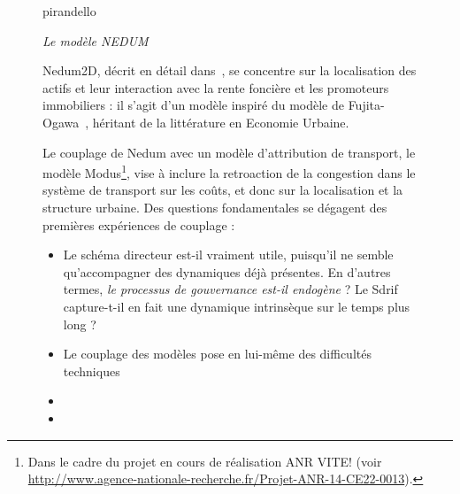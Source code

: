 \begin{figure}[h!]
	\begin{mdframed}
	
	\cite{delons:hal-00319087} pirandello
	
	\textit{Le modèle NEDUM}
	
	Nedum2D, décrit en détail dans~\cite{viguie2014downscaling}, se concentre sur la localisation des actifs et leur interaction avec la rente foncière et les promoteurs immobiliers : il s'agit d'un modèle inspiré du modèle de Fujita-Ogawa~\cite{fujita1982multiple}, héritant de la littérature en Economie Urbaine.
	
	
	
	Le couplage de Nedum avec un modèle d'attribution de transport, le modèle Modus\footnote{Dans le cadre du projet en cours de réalisation ANR VITE! (voir \url{http://www.agence-nationale-recherche.fr/Projet-ANR-14-CE22-0013}).}, vise à inclure la retroaction de la congestion dans le système de transport sur les coûts, et donc sur la localisation et la structure urbaine. Des questions fondamentales se dégagent des premières expériences de couplage :
	\begin{itemize}
		\item Le schéma directeur est-il vraiment utile, puisqu'il ne semble qu'accompagner des dynamiques déjà présentes. En d'autres termes, \textit{le processus de gouvernance est-il endogène} ? Le Sdrif capture-t-il en fait une dynamique intrinsèque sur le temps plus long ?
		\item Le couplage des modèles pose en lui-même des difficultés techniques
		\item 
		\item 
	\end{itemize}
	
	
	
	\medskip
	
	
	\end{mdframed}
\end{figure}



